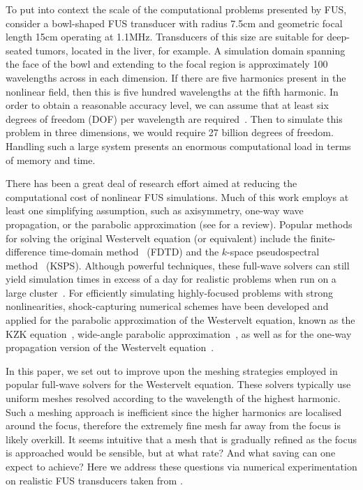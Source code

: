 \documentclass[11pt]{article}
\numberwithin{equation}{section}
\newcommand{\red}[1]{{\color{black} #1}}
\begin{document}
To put into context the scale of the computational problems presented by 
\red{FUS}, consider a bowl-shaped \red{FUS} transducer with radius 7.5cm and 
geometric focal length 15cm operating at 1.1MHz. 
Transducers of this size are suitable for deep-seated tumors, located in the liver,
for example. A simulation domain spanning the face of the bowl and extending to the 
focal region is approximately 100 wavelengths across in each dimension. If there 
are five harmonics present in the nonlinear field, then this is five hundred 
wavelengths at the fifth harmonic. In order to obtain a reasonable accuracy level,
we can assume that at least six degrees of freedom (DOF) per wavelength are required~\cite{marburg2008discretization}.
Then to simulate this problem in three dimensions, we would require 27 billion 
degrees of freedom. Handling such a large system
presents an enormous computational load in terms of memory and time. 

There has been a great deal of research effort aimed at reducing the computational
cost of nonlinear \red{FUS} simulations. Much of this work employs at least one simplifying assumption, 
such as axisymmetry, one-way wave propagation, or the parabolic approximation
(see \cite{gu2015modeling} for a review). Popular methods for solving 
the original Westervelt equation (or equivalent) include the finite-difference 
time-domain method~\cite{solovchuk2013simulation} (FDTD) and the $k$-space 
pseudospectral method~\cite{treeby2012modeling} (KSPS). Although powerful 
techniques, these full-wave solvers can still yield simulation times in excess 
of a day for realistic problems when run on a large cluster~\cite{jaros2016full}.
\red{For efficiently simulating highly-focused problems with strong nonlinearities,
shock-capturing numerical schemes have been developed and applied for 
the parabolic approximation of the Westervelt equation, known as the KZK equation~\cite{bessonova2009focusing},
wide-angle parabolic approximation~\cite{yuldashev2018wide}, as well as for the 
one-way propagation version of the Westervelt equation~\cite{yuldashev2011simulation}.}

In this paper, we set out to improve upon the meshing strategies employed in 
popular full-wave solvers for the Westervelt equation. \red{These solvers typically use} uniform 
meshes resolved according 
to the wavelength of the highest harmonic. Such a meshing approach is 
inefficient since the higher harmonics are localised around the focus, 
therefore the extremely fine mesh far away from the focus 
is likely overkill. It seems intuitive that a mesh that is gradually refined 
as the focus is approached would be sensible, but at what rate? And what saving 
can one expect to achieve? Here we address these questions via numerical 
experimentation on realistic \red{FUS} transducers taken from \cite{sonic}.
\end{document}
